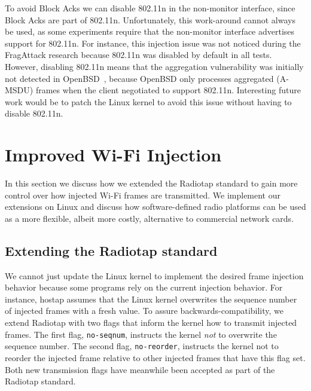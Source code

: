 \documentclass[sigconf]{acmart}
\newcommand{\wifi}{\mbox{Wi-Fi}}
\newcommand{\red}[1]{\textcolor{red}{#1}}
\begin{document}
To avoid Block Acks we can disable 802.11n in the non-monitor interface, since Block Acks are part of 802.11n.
Unfortunately, this work-around cannot always be used, as some experiments require that the non-monitor interface advertises support for 802.11n.
For instance, this injection issue was not noticed during the FragAttack research because 802.11n was disabled by default in all tests.
However, disabling 802.11n means that the aggregation vulnerability was initially not detected in OpenBSD~\cite{vanhoef-usenix2021-fragattacks}, because  OpenBSD only processes aggregated (A-MSDU) frames when the client negotiated to support 802.11n.
Interesting future work would be to patch the Linux kernel to avoid this issue without having to disable 802.11n.

\section{Improved Wi-Fi Injection}
\label{sec:improvedinjection}

In this section we discuss how we extended the Radiotap standard to gain more control over how injected \wifi{} frames are transmitted.
We implement our extensions on Linux and discuss how software-defined radio platforms can be used as a more flexible, albeit more costly, alternative to commercial network cards.

\subsection{Extending the Radiotap standard}

We cannot just update the Linux kernel to implement the desired frame injection behavior because some programs rely on the current injection behavior.
For instance, hostap assumes that the Linux kernel overwrites the sequence number of injected frames with a fresh value.
To assure backwards-compatibility, we extend Radiotap with two flags that inform the kernel how to transmit injected frames.
The first flag, \verb|no-seqnum|, instructs the kernel \emph{not} to overwrite the sequence number. %
The second flag, \verb|no-reorder|, instructs the kernel not to reorder the injected frame relative to other injected frames that have this flag set.
Both new transmission flags have meanwhile been accepted as part of the Radiotap standard.
\end{document}
